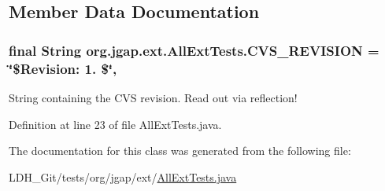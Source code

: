 \subsection{Member Data Documentation}
\hypertarget{classorg_1_1jgap_1_1ext_1_1_all_ext_tests_aa4d46a79f04e89ee1139709579fe8c2a}{
\subsubsection[{C\-V\-S\-\_\-\-R\-E\-V\-I\-S\-I\-O\-N}]{\setlength{\rightskip}{0pt plus 5cm}final String org.\-jgap.\-ext.\-All\-Ext\-Tests.\-C\-V\-S\-\_\-\-R\-E\-V\-I\-S\-I\-O\-N = \char`\"{}\$Revision\-: 1. \$\char`\"{}\hspace{0.3cm}{\ttfamily [static]}, {\ttfamily [private]}}}\label{classorg_1_1jgap_1_1ext_1_1_all_ext_tests_aa4d46a79f04e89ee1139709579fe8c2a}
String containing the C\-V\-S revision. Read out via reflection! 

Definition at line 23 of file All\-Ext\-Tests.\-java.



The documentation for this class was generated from the following file\-:\begin{DoxyCompactItemize}
\item 
L\-D\-H\-\_\-\-Git/tests/org/jgap/ext/\hyperlink{_all_ext_tests_8java}{All\-Ext\-Tests.\-java}\end{DoxyCompactItemize}
